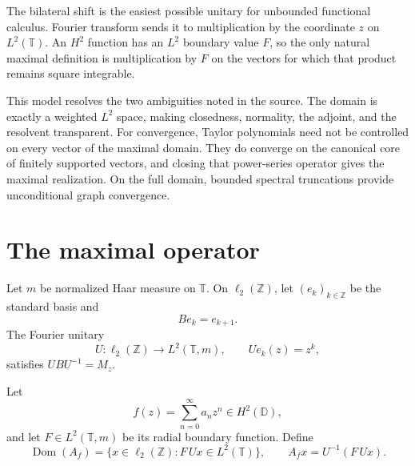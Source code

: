 \documentclass[11pt]{article}
\theoremstyle{remark}
\newcommand{\D}{\mathbb{D}}
\newcommand{\T}{\mathbb{T}}
\newcommand{\Z}{\mathbb{Z}}
\newcommand{\Dom}{\operatorname{Dom}}
\begin{document}
The bilateral shift is the easiest possible unitary for unbounded functional
calculus.  Fourier transform sends it to multiplication by the coordinate
\(z\) on \(L^2(\T)\).  An \(H^2\) function has an \(L^2\) boundary value
\(F\), so the only natural maximal definition is multiplication by \(F\) on
the vectors for which that product remains square integrable.

This model resolves the two ambiguities noted in the source.  The domain is
exactly a weighted \(L^2\) space, making closedness, normality, the adjoint,
and the resolvent transparent.  For convergence, Taylor polynomials need not
be controlled on every vector of the maximal domain.  They do converge on
the canonical core of finitely supported vectors, and closing that
power-series operator gives the maximal realization.  On the full domain,
bounded spectral truncations provide unconditional graph convergence.

\section{The maximal operator}

Let \(m\) be normalized Haar measure on \(\T\).  On
\(\ell_2(\Z)\), let \((e_k)_{k\in\Z}\) be the standard basis and
\[
 Be_k=e_{k+1}.
\]
The Fourier unitary
\[
 U:\ell_2(\Z)\longrightarrow L^2(\T,m),
 \qquad Ue_k(z)=z^k,
\]
satisfies \(UBU^{-1}=M_z\).

Let
\[
 f(z)=\sum_{n=0}^{\infty}a_nz^n\in H^2(\D),
\]
and let \(F\in L^2(\T,m)\) be its radial boundary function.  Define
\begin{equation}\label{eq:def}
 \Dom(A_f)=\{x\in\ell_2(\Z):F\,Ux\in L^2(\T)\},
 \qquad
 A_fx=U^{-1}(F\,Ux).
\end{equation}
\end{document}
